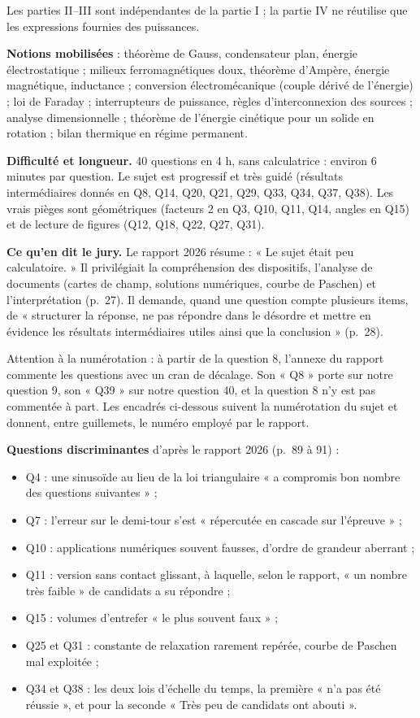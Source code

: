 \documentclass[11pt,a4paper]{article}
\providecommand{\tightlist}{\setlength{\itemsep}{0pt}\setlength{\parskip}{0pt}}
\begin{document}
Les parties II--III sont indépendantes de la partie I ; la partie IV ne réutilise que les expressions fournies des puissances.

\textbf{Notions mobilisées} : théorème de Gauss, condensateur plan, énergie électrostatique ; milieux ferromagnétiques doux, théorème d'Ampère, énergie magnétique, inductance ; conversion électromécanique (couple dérivé de l'énergie) ; loi de Faraday ; interrupteurs de puissance, règles d'interconnexion des sources ; analyse dimensionnelle ; théorème de l'énergie cinétique pour un solide en rotation ; bilan thermique en régime permanent.

\textbf{Difficulté et longueur.} 40 questions en 4 h, sans calculatrice : environ 6 minutes par question. Le sujet est progressif et très guidé (résultats intermédiaires donnés en Q8, Q14, Q20, Q21, Q29, Q33, Q34, Q37, Q38). Les vrais pièges sont géométriques (facteurs 2 en Q3, Q10, Q11, Q14, angles en Q15) et de lecture de figures (Q12, Q18, Q22, Q27, Q31).

\textbf{Ce qu'en dit le jury.} Le rapport 2026 résume : « Le sujet était peu calculatoire. » Il privilégiait la compréhension des dispositifs, l'analyse de documents (cartes de champ, solutions numériques, courbe de Paschen) et l'interprétation (p.~27). Il demande, quand une question compte plusieurs items, de « structurer la réponse, ne pas répondre dans le désordre et mettre en évidence les résultats intermédiaires utiles ainsi que la conclusion » (p.~28).

Attention à la numérotation : à partir de la question 8, l'annexe du rapport commente les questions avec un cran de décalage. Son « Q8 » porte sur notre question 9, son « Q39 » sur notre question 40, et la question 8 n'y est pas commentée à part. Les encadrés ci-dessous suivent la numérotation du sujet et donnent, entre guillemets, le numéro employé par le rapport.

\textbf{Questions discriminantes} d'après le rapport 2026 (p.~89 à 91) :

\begin{itemize}
\tightlist
\item
  Q4 : une sinusoïde au lieu de la loi triangulaire « a compromis bon nombre des questions suivantes » ;
\item
  Q7 : l'erreur sur le demi-tour s'est « répercutée en cascade sur l'épreuve » ;
\item
  Q10 : applications numériques souvent fausses, d'ordre de grandeur aberrant ;
\item
  Q11 : version sans contact glissant, à laquelle, selon le rapport, « un nombre très faible » de candidats a su répondre ;
\item
  Q15 : volumes d'entrefer « le plus souvent faux » ;
\item
  Q25 et Q31 : constante de relaxation rarement repérée, courbe de Paschen mal exploitée ;
\item
  Q34 et Q38 : les deux lois d'échelle du temps, la première « n'a pas été réussie », et pour la seconde « Très peu de candidats ont abouti ».
\end{itemize}
\end{document}

